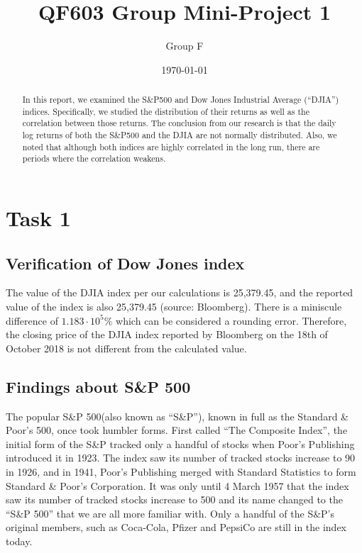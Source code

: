 \documentclass[a4paper]{article}
\title{QF603 Group Mini-Project 1}
\author{Group F}
\date{\today}
\begin{document}
\maketitle

\begin{abstract}
In this report, we examined the S\&P500 and Dow Jones Industrial Average (``DJIA'') indices. Specifically, we studied the distribution of their returns as well as the correlation between those returns. The conclusion from our research is that the daily log returns of both the S\&P500 and the DJIA are not normally distributed. Also, we noted that although both indices are highly correlated in the long run, there are periods where the correlation weakens.
\end{abstract} 

\section{Task 1}
\label{sec:introduction}

\subsection{Verification of Dow Jones index}
The value of the DJIA index per our calculations is 25,379.45, and the reported value of the index is also 25,379.45 (source: Bloomberg). There is a miniscule difference of $1.183\cdot10^5\%$ which can be considered a rounding error. Therefore, the closing price of the DJIA index reported by Bloomberg on the 18th of October 2018 is not different from the calculated value.


\subsection{Findings about S\&P 500}
The popular S\&P 500(also known as ``S\&P''), known in full as the Standard \& Poor’s 500, once took humbler forms. First called “The Composite Index”, the initial form of the S\&P tracked only a handful of stocks when Poor’s Publishing introduced it in 1923. The index saw its number of tracked stocks increase to 90 in 1926, and in 1941, Poor’s Publishing merged with Standard Statistics to form Standard \& Poor’s Corporation. It was only until 4 March 1957 that the index saw its number of tracked stocks increase to 500 and its name changed to the “S\&P 500” that we are all more familiar with. Only a handful of the S\&P’s original members, such as Coca-Cola, Pfizer and PepsiCo are still in the index today.
\end{document}
